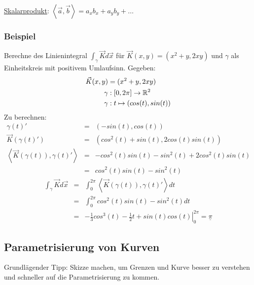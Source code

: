 \underline{Skalarprodukt}: $\left< \vec{a}, \vec{b} \right> = a_x b_x + a_y b_y + \ldots$

\subsubsection{Beispiel}
Berechne des Linienintegral $\int_\gamma \vec{K} d\vec{x} $ für $ \vec{K}(x,y) = (x^2+y, 2xy)$ und $\gamma$ als Einheitskreis mit positivem Umlaufsinn.
Gegeben:
\begin{align*}
\vec{K}(x,y) &= (x^2+y, 2xy) \\
\gamma &: [0,2\pi]  \to \mathbb{R}^2\\
\gamma &: t \mapsto   (cos(t), sin(t)) 
\end{align*}
Zu berechnen:
\begin{eqnarray*}
\gamma(t)' &=& (-sin(t),cos(t))\\
\vec{K}(\gamma(t)') &=& (cos^2(t) + sin(t), 2 cos(t)sin(t))\\
\left< \vec{K}(\gamma(t)), \gamma(t)' \right> &=& -cos^2(t)sin(t) - sin^2(t) + 2cos^2(t)sin(t)\\
 &=& cos^2(t)sin(t) - sin^2(t)
\end{eqnarray*}
\begin{eqnarray*}
\int_\gamma \vec{K} d\vec{x} &=& \int_0^{2\pi} \left< \vec{K}(\gamma(t)), \gamma(t)' \right> dt\\
&=& \int_0^{2\pi} cos^2(t)sin(t) - sin^2(t) dt\\
&=& \left. -\frac{1}{3}cos^3(t) - \frac{1}{2}t + sin(t)cos(t) \right|_0^{2\pi} = \underline{\pi}
\end{eqnarray*}




\subsection{Parametrisierung von Kurven}
Grundlägender Tipp: Skizze machen, um Grenzen und Kurve besser zu verstehen und
schneller auf die Parametrisierung zu kommen.

